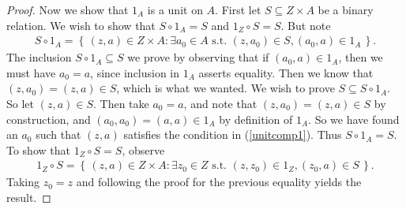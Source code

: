 \documentclass[12pt, reqno]{amsart}
\theoremstyle{definition}
\theoremstyle{definition}
\numberwithin{theorem}{section}
\theoremstyle{plain}
\theoremstyle{definition}
\theoremstyle{remark}
\newcommand{\sub}{\subseteq}				%
\newcommand{\bee}{\begin{equation}\begin{aligned}}
\newcommand{\eee}{\end{aligned}\end{equation}}
\renewcommand{\'}{\hspace{0.5mm}'}			%
\renewcommand{\Set}[1]{\left\{\,#1\,\right\}}	%
\begin{document}
\begin{enumerate}[label=\textbf{\arabic*.}]
\begin{proof}
	Now we show that $1_A$ is a unit on $A$. First
	let $S \sub Z \times A$
	be a binary relation. We wish to show
	that $S \circ 1_A = S$ and $1_Z \circ S = S$. But note
	\bee\label{unitcomp1}
		S \circ 1_A = \Set{(z,a) \in Z \times A: 
		\exists a_0 \in A \text{ s.t. } (z,a_0) 
		\in S, (a_0,a) \in 1_A}. 
	\eee
	The inclusion $S \circ 1_A \sub S$ we prove by observing
	that if $(a_0,a) \in 1_A$, then we must have $a_0 = a$, 
	since inclusion in $1_A$ asserts equality. Then we know
	that $(z,a_0) = (z,a) \in S$, which is what we wanted. 
	We wish to prove $S \sub S \circ 1_A$. So let
	$(z,a) \in S$. Then take $a_0 = a$, and note that
	$(z,a_0) = (z,a) \in S$ by construction, and 
	$(a_0,a_0) = (a,a) \in 1_A$ by definition of $1_A$. So
	we have found an $a_0$ such that $(z,a)$ satisfies
	the condition in (\ref{unitcomp1}). Thus $S\circ 1_A = S$. 
	To show that $1_Z \circ S = S$, observe
	\bee
		1_Z \circ S = \Set{(z,a) \in Z \times A: \exists 
		z_0 \in Z \text{ s.t. } (z,z_0) \in 1_Z, (z_0,a) \in S}. 
	\eee
	Taking $z_0 = z$ and following the proof for the previous
	equality yields the result. 
\end{proof}


\end{enumerate}
\end{document}
